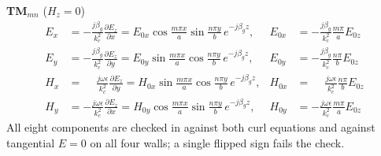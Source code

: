 \par{}
\textbf{TM$_{mn}$} \quad ($H_z = 0$)
\[
\begin{aligned}
E_x &= -\frac{j\beta_g}{k_c^2}\frac{\partial E_z}{\partial x} = E_{0x}\cos\frac{m\pi x}{a}\sin\frac{n\pi y}{b}\,e^{-j\beta_g z}, &
E_{0x} &= -\frac{j\beta_g}{k_c^2}\frac{m\pi}{a}E_{0z} \\
E_y &= -\frac{j\beta_g}{k_c^2}\frac{\partial E_z}{\partial y} = E_{0y}\sin\frac{m\pi x}{a}\cos\frac{n\pi y}{b}\,e^{-j\beta_g z}, &
E_{0y} &= -\frac{j\beta_g}{k_c^2}\frac{n\pi}{b}E_{0z} \\
H_x &= \phantom{-}\frac{j\omega\epsilon}{k_c^2}\frac{\partial E_z}{\partial y} = H_{0x}\sin\frac{m\pi x}{a}\cos\frac{n\pi y}{b}\,e^{-j\beta_g z}, &
H_{0x} &= \phantom{-}\frac{j\omega\epsilon}{k_c^2}\frac{n\pi}{b}E_{0z} \\
H_y &= -\frac{j\omega\epsilon}{k_c^2}\frac{\partial E_z}{\partial x} = H_{0y}\cos\frac{m\pi x}{a}\sin\frac{n\pi y}{b}\,e^{-j\beta_g z}, &
H_{0y} &= -\frac{j\omega\epsilon}{k_c^2}\frac{m\pi}{a}E_{0z}
\end{aligned}
\]
{\color{sub}\footnotesize All eight components are checked in  against both curl
equations and against tangential $E = 0$ on all four walls; a single flipped sign fails the
check.}

